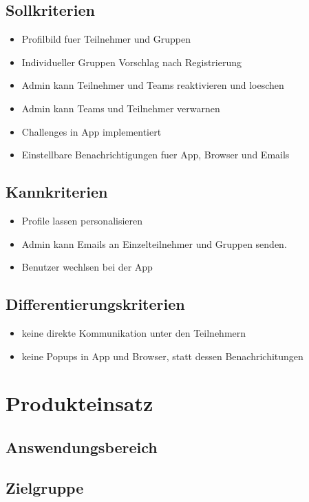 \documentclass[10pt,a4paper]{article}
\begin{document}
	\subsection{Sollkriterien}
	\begin{itemize}
			\item Profilbild fuer Teilnehmer und Gruppen
			\item Individueller Gruppen Vorschlag nach Registrierung
			\item Admin kann Teilnehmer und Teams reaktivieren und loeschen
			\item Admin kann Teams und Teilnehmer verwarnen
			\item Challenges in App implementiert
			\item Einstellbare Benachrichtigungen fuer App, Browser und Emails
		\end{itemize}
	\subsection{Kannkriterien}
	\begin{itemize}
			\item Profile lassen personalisieren
			\item Admin kann Emails an Einzelteilnehmer und Gruppen senden.
			\item Benutzer wechlsen bei der App
	\end{itemize}
	\subsection{Differentierungskriterien}
	\begin{itemize}
		\item keine direkte Kommunikation unter den Teilnehmern
		\item keine Popups in App und Browser, statt dessen Benachrichitungen 
	\end{itemize}
\section{Produkteinsatz}
\subsection{Answendungsbereich}
\subsection{Zielgruppe}
\end{document}
